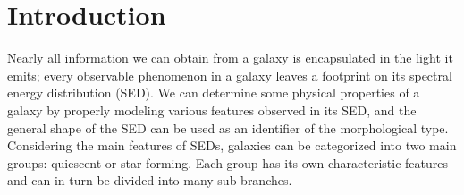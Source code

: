 


\section{Introduction}
\label{sec: intro_somz}


Nearly all information we can obtain from a galaxy is encapsulated in the light it emits; every observable phenomenon in a galaxy leaves a footprint on its spectral energy distribution (SED).
We can determine some physical properties of a galaxy by properly modeling various features observed in its SED, and the general shape of the SED can be used as an identifier of the morphological type.
Considering the main features of SEDs, galaxies can be categorized into two main groups: quiescent or star-forming.
Each group has its own characteristic features and can in turn be divided into many sub-branches.


